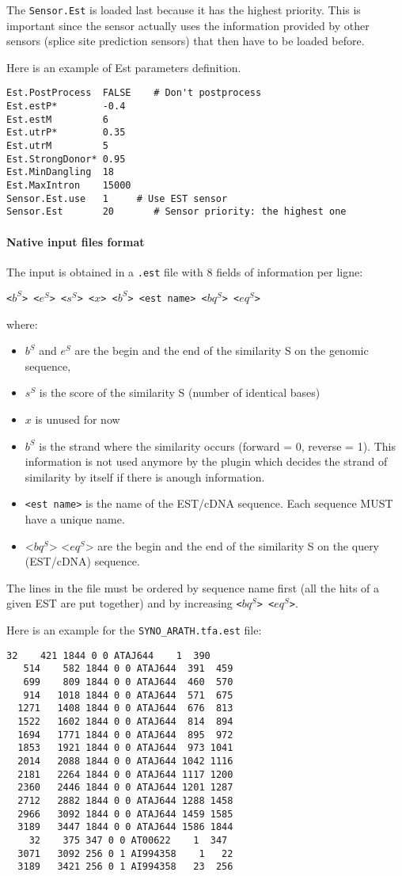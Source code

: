 The \texttt{Sensor.Est} is loaded last because it has the highest priority.
This is important since the sensor actually uses the information
provided by other sensors (splice site prediction sensors) that then have to be loaded before.

Here is an example of Est parameters definition.
\begin{Verbatim}[fontsize=\small]
Est.PostProcess  FALSE    # Don't postprocess
Est.estP*        -0.4
Est.estM         6
Est.utrP*        0.35
Est.utrM         5
Est.StrongDonor* 0.95
Est.MinDangling  18
Est.MaxIntron    15000
Sensor.Est.use   1     # Use EST sensor
Sensor.Est       20       # Sensor priority: the highest one
\end{Verbatim}


\paragraph{Native input files format}

The input is obtained in a \texttt{.est} file with 8 fields of information
per ligne:

\texttt{<$b^S$> <$e^S$> <$s^S$> <$x$> <$b^S$> <est name> <$bq^S$> <$eq^S$>}

where:
\begin{itemize}
\item $b^S$ and $e^S$ are the begin and the end of the similarity S on the genomic sequence,
\item $s^S$ is the score of the similarity S (number of identical bases)
\item $x$ is unused for now
\item $b^S$ is the strand where the similarity occurs (forward = 0,
  reverse = 1). This information is not used anymore by the plugin
  which decides the strand of similarity by itself if there is anough
  information.
\item \texttt{<est name>} is the name of the EST/cDNA sequence. Each
  sequence MUST have a unique name.
\item <$bq^S$> <$eq^S$> are the begin and the end of the similarity S
  on the query (EST/cDNA) sequence.
\end{itemize}
The lines in the file must be ordered by sequence name first (all the
hits of a given EST are put together) and by increasing
\texttt{<$bq^S$> <$eq^S$>}. 

Here is an example for the \texttt{SYNO\_ARATH.tfa.est} file:
\begin{Verbatim}[fontsize=\small]
    32    421 1844 0 0 ATAJ644    1  390
   514    582 1844 0 0 ATAJ644  391  459
   699    809 1844 0 0 ATAJ644  460  570
   914   1018 1844 0 0 ATAJ644  571  675
  1271   1408 1844 0 0 ATAJ644  676  813
  1522   1602 1844 0 0 ATAJ644  814  894
  1694   1771 1844 0 0 ATAJ644  895  972
  1853   1921 1844 0 0 ATAJ644  973 1041
  2014   2088 1844 0 0 ATAJ644 1042 1116
  2181   2264 1844 0 0 ATAJ644 1117 1200
  2360   2446 1844 0 0 ATAJ644 1201 1287
  2712   2882 1844 0 0 ATAJ644 1288 1458
  2966   3092 1844 0 0 ATAJ644 1459 1585
  3189   3447 1844 0 0 ATAJ644 1586 1844
    32    375 347 0 0 AT00622    1  347
  3071   3092 256 0 1 AI994358    1   22
  3189   3421 256 0 1 AI994358   23  256
\end{Verbatim}

